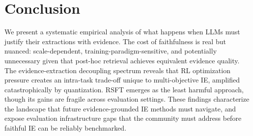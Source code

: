 \documentclass[11pt]{article}
\begin{document}
\section{Conclusion}

We present a systematic empirical analysis of what happens when LLMs must justify their extractions with evidence. The cost of faithfulness is real but nuanced: scale-dependent, training-paradigm-sensitive, and potentially unnecessary given that post-hoc retrieval achieves equivalent evidence quality. The evidence-extraction decoupling spectrum reveals that RL optimization pressure creates an intra-task trade-off unique to multi-objective IE, amplified catastrophically by quantization. RSFT emerges as the least harmful approach, though its gains are fragile across evaluation settings. These findings characterize the landscape that future evidence-grounded IE methods must navigate, and expose evaluation infrastructure gaps that the community must address before faithful IE can be reliably benchmarked.
\end{document}
